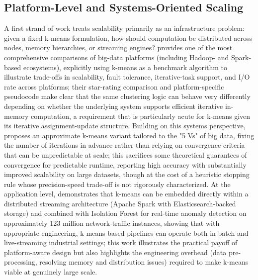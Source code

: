 \subsection{Platform-Level and Systems-Oriented Scaling}
A first strand of work treats scalability primarily as an infrastructure problem: given a fixed k-means formulation, how should computation be distributed across nodes, memory hierarchies, or streaming engines? \cite{singh2014survey} provides one of the most comprehensive comparisons of big-data platforms (including Hadoop- and Spark-based ecosystems), explicitly using k-means as a benchmark algorithm to illustrate trade-offs in scalability, fault tolerance, iterative-task support, and I/O rate across platforms; their star-rating comparison and platform-specific pseudocode make clear that the same clustering logic can behave very differently depending on whether the underlying system supports efficient iterative in-memory computation, a requirement that is particularly acute for k-means given its iterative assignment-update structure. Building on this systems perspective, \cite{jain2014adapting} proposes an approximate k-means variant tailored to the "5 Vs" of big data, fixing the number of iterations in advance rather than relying on convergence criteria that can be unpredictable at scale; this sacrifices some theoretical guarantees of convergence for predictable runtime, reporting high accuracy with substantially improved scalability on large datasets, though at the cost of a heuristic stopping rule whose precision-speed trade-off is not rigorously characterized. At the application level, \cite{laskar2021extending} demonstrates that k-means can be embedded directly within a distributed streaming architecture (Apache Spark with Elasticsearch-backed storage) and combined with Isolation Forest for real-time anomaly detection on approximately 123 million network-traffic instances, showing that with appropriate engineering, k-means-based pipelines can operate both in batch and live-streaming industrial settings; this work illustrates the practical payoff of platform-aware design but also highlights the engineering overhead (data pre-processing, resolving memory and distribution issues) required to make k-means viable at genuinely large scale.

